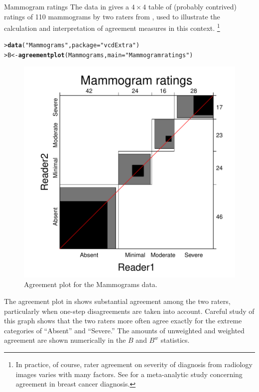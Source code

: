 \documentclass[10pt,krantz2]{krantz}\usepackage[]{graphicx}\usepackage[]{color}
\makeatletter
\newcommand{\hlstr}[1]{\textcolor[rgb]{0.192,0.494,0.8}{#1}}%
\newcommand{\hlstd}[1]{\textcolor[rgb]{0.345,0.345,0.345}{#1}}%
\newcommand{\hlkwb}[1]{\textcolor[rgb]{0.69,0.353,0.396}{#1}}%
\newcommand{\hlkwc}[1]{\textcolor[rgb]{0.333,0.667,0.333}{#1}}%
\newcommand{\hlkwd}[1]{\textcolor[rgb]{0.737,0.353,0.396}{\textbf{#1}}}%
\newenvironment{kframe}{%
 \def\at@end@of@kframe{}%
 \ifinner\ifhmode%
  \def\at@end@of@kframe{\end{minipage}}%
  \begin{minipage}{\columnwidth}%
 \fi\fi%
 \def\FrameCommand##1{\hskip\@totalleftmargin \hskip-\fboxsep
 \colorbox{shadecolor}{##1}\hskip-\fboxsep
     \hskip-\linewidth \hskip-\@totalleftmargin \hskip\columnwidth}%
 \MakeFramed {\advance\hsize-\width
   \@totalleftmargin\z@ \linewidth\hsize
   \@setminipage}}%
 {\par\unskip\endMakeFramed%
 \at@end@of@kframe}
\newenvironment{knitrout}{}{} %
\renewenvironment{knitrout}{\small\renewcommand{\baselinestretch}{.85}}{} %
\makeatother
\begin{document}
\begin{Example}[mammograms]{Mammogram ratings}
The  data in  gives a $4 \times 4$ table
of (probably contrived) ratings of 110 mammograms by two raters from
\citet{KundelPolansky:2003}, used to illustrate the calculation
and interpretation of agreement measures in this context.%
\footnote{
In practice, of course, rater agreement on severity of diagnosis from
radiology images varies with many factors.  See \citet{AntonioCrespi:2010}
for a meta-analytic study concerning agreement in breast cancer diagnosis.
}

\begin{knitrout}
\color{fgcolor}\begin{kframe}
\begin{alltt}
\hlstd{> }\hlkwd{data}\hlstd{(}\hlstr{"Mammograms"}\hlstd{,} \hlkwc{package} \hlstd{=} \hlstr{"vcdExtra"}\hlstd{)}
\hlstd{> }\hlstd{B} \hlkwb{<-} \hlkwd{agreementplot}\hlstd{(Mammograms,} \hlkwc{main} \hlstd{=} \hlstr{"Mammogram ratings"}\hlstd{)}
\end{alltt}
\end{kframe}\begin{figure}[!htbp]

\centerline{\includegraphics[width=.6\textwidth]{ch04/fig/mammograms1-1} }

\caption[Agreement plot for the Mammograms data]{Agreement plot for the Mammograms data.\label{fig:mammograms1}}
\end{figure}


\end{knitrout}
The agreement plot in  shows substantial agreement
among the two raters, particularly when one-step disagreements are taken into
account.  Careful study of this graph shows that the two raters more often
agree exactly for the extreme categories of ``Absent'' and ``Severe.''
The amounts of unweighted and weighted
agreement are shown numerically in the $B$ and $B^w$
statistics.


\end{Example}
\end{document}
